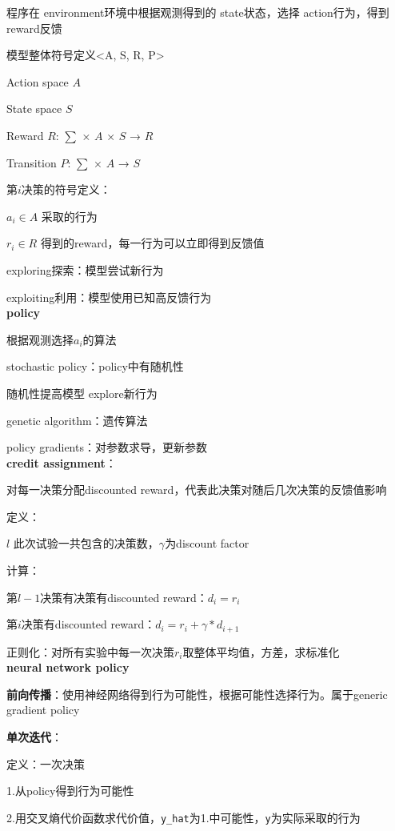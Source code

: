 \documentclass[UTF8]{ctexart}
\begin{document}
  程序在 environment环境中根据观测得到的 state状态，选择 action行为，得到reward反馈

  模型整体符号定义<A, S, R, P>

  \quad Action space $A$
  
  \quad State space $S$
  
  \quad Reward $R$: $\sum$ × $A$ × $S$ → $R$
  
  \quad Transition $P$: $\sum$ × $A$ → $S$

  第$i$决策的符号定义：

  \quad $a_i \in A$ 采取的行为

  \quad $r_i \in R$ 得到的reward，每一行为可以立即得到反馈值
  
  exploring探索：模型尝试新行为
  
  exploiting利用：模型使用已知高反馈行为\\
\textbf{policy}

  根据观测选择$a_i$的算法

  stochastic policy：policy中有随机性

  \quad 随机性提高模型 explore新行为

  genetic algorithm：遗传算法

  policy gradients：对参数求导，更新参数\\
\textbf{credit assignment}：

  对每一决策分配discounted reward，代表此决策对随后几次决策的反馈值影响

  定义：

  \quad $l$ 此次试验一共包含的决策数，$\gamma$为discount factor

  计算：

  \quad 第$l-1$决策有决策有discounted reward：$d_i = r_i$
  
  \quad 第$i$决策有discounted reward：$d_i = r_i + \gamma * d_{i+1}$
  
  \quad 正则化：对所有实验中每一次决策$r_i$取整体平均值，方差，求标准化\\
\textbf{neural network policy}

  \textbf{前向传播}：使用神经网络得到行为可能性，根据可能性选择行为。属于generic gradient policy

  \textbf{单次迭代}：

  \quad 定义：一次决策

  \quad \quad 1.从policy得到行为可能性

  \quad \quad 2.用交叉熵代价函数求代价值，\texttt{y\_hat}为1.中可能性，\texttt{y}为实际采取的行为
\end{document}
